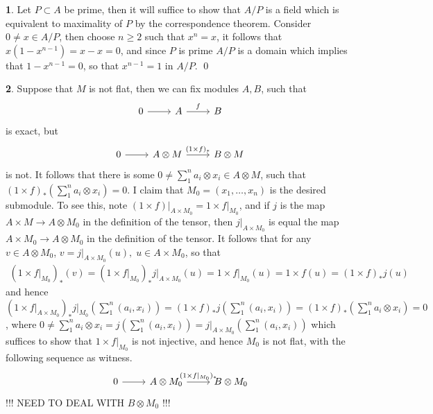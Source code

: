 \documentclass[11pt]{article}
\theoremstyle{definition}
\newtheorem{pb}{}
\begin{document}
    \begin{pb}
        Let \(P \subset A\) be prime, then it will suffice to show that \(A/P\) is a field which is equivalent to maximality of \(P\) by the correspondence theorem. Consider \(0 \neq x \in A/P\), then choose \(n \geq 2\) such that \(x^n = x\), it follows that \(x(1-x^{n-1}) = x-x = 0\), and since \(P\) is prime \(A/P\) is a domain which implies that \(1-x^{n-1} = 0\), so that \(x^{n-1} = 1\) in \(A/P\). \qed
    \end{pb}
    \begin{pb}
        Suppose that \(M\) is not flat, then we can fix modules \(A,B\), such that
        \begin{equation*}
            \begin{tikzcd}
                0 \arrow[r,"{}"] & A \arrow[r,"{f}"] & B
            \end{tikzcd}
        \end{equation*}
        is exact, but
        \begin{equation*}
            \begin{tikzcd}
                0 \arrow[r,"{}"] & A\otimes M \arrow[r,"{(1\times f)_*}"] & B \otimes M
            \end{tikzcd}
        \end{equation*}
        is not. It follows that there is some \(0 \neq \sum_1^n a_i \otimes x_i \in A \otimes M\), such that \((1\times f)_*(\sum_1^n a_i\otimes x_i) = 0\). I claim that \(M_0 = (x_1,\hdots,x_n)\) is the desired submodule. To see this, note \((1 \times f)\vert_{A \times M_0} = 1\times f\vert_{M_0}\), and if \(j\) is the map \(A \times M \to A \otimes M_0\) in the definition of the tensor, then \(j\vert_{A \times M_0}\) is equal the map \(A \times M_0 \to A \otimes M_0\) in the definition of the tensor. It follows that for any \(v \in A \otimes M_0\), \(v = j\vert_{A \times M_0}(u), \; u \in A \times M_0\), so that
        \begin{align*}
            (1 \times f\vert_{M_0})_*(v) = (1 \times f\vert_{M_0})_*j\vert_{A \times M_0}(u) = 1 \times f\vert_{M_0}(u) = 1 \times f (u) = (1\times f)_*j(u)
        \end{align*}
        and hence \((1 \times f\vert_{A \times M_0})_*j\vert_{M_0}(\sum_1^n (a_i, x_i)) = (1 \times f)_*j(\sum_1^n (a_i,x_i)) = (1\times f)_*(\sum_1^n a_i \otimes x_i) = 0\), where \(0 \neq \sum_1^n a_i \otimes x_i =  j(\sum_1^n (a_i,x_i)) = j\vert_{A \times M_0}(\sum_1^n (a_i,x_i))\) which suffices to show that \(1 \times f\vert_{M_0}\) is not injective, and hence \(M_0\) is not flat, with the following sequence as witness.
        \begin{equation*}
            \begin{tikzcd}
                0 \arrow[r,"{}"] &A \otimes M_0 \arrow[r,"{(1 \times f\vert_{M_0})_*}"] &B \otimes M_0
            \end{tikzcd}
        \end{equation*}
        !!! NEED TO DEAL WITH \(B \otimes M_0\) !!!
    \end{pb}
\end{document}
